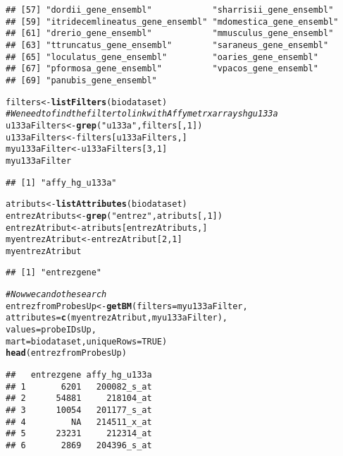 \documentclass{article}\usepackage[]{graphicx}\usepackage[]{color}
\makeatletter
\newcommand{\hlnum}[1]{\textcolor[rgb]{0.686,0.059,0.569}{#1}}%
\newcommand{\hlstr}[1]{\textcolor[rgb]{0.192,0.494,0.8}{#1}}%
\newcommand{\hlcom}[1]{\textcolor[rgb]{0.678,0.584,0.686}{\textit{#1}}}%
\newcommand{\hlstd}[1]{\textcolor[rgb]{0.345,0.345,0.345}{#1}}%
\newcommand{\hlkwb}[1]{\textcolor[rgb]{0.69,0.353,0.396}{#1}}%
\newcommand{\hlkwc}[1]{\textcolor[rgb]{0.333,0.667,0.333}{#1}}%
\newcommand{\hlkwd}[1]{\textcolor[rgb]{0.737,0.353,0.396}{\textbf{#1}}}%
\newenvironment{kframe}{%
 \def\at@end@of@kframe{}%
 \ifinner\ifhmode%
  \def\at@end@of@kframe{\end{minipage}}%
  \begin{minipage}{\columnwidth}%
 \fi\fi%
 \def\FrameCommand##1{\hskip\@totalleftmargin \hskip-\fboxsep
 \colorbox{shadecolor}{##1}\hskip-\fboxsep
     \hskip-\linewidth \hskip-\@totalleftmargin \hskip\columnwidth}%
 \MakeFramed {\advance\hsize-\width
   \@totalleftmargin\z@ \linewidth\hsize
   \@setminipage}}%
 {\par\unskip\endMakeFramed%
 \at@end@of@kframe}
\newenvironment{knitrout}{}{} %
\makeatother
\begin{document}
\begin{knitrout}
\begin{kframe}
\begin{verbatim}
## [57] "dordii_gene_ensembl"            "sharrisii_gene_ensembl"        
## [59] "itridecemlineatus_gene_ensembl" "mdomestica_gene_ensembl"       
## [61] "drerio_gene_ensembl"            "mmusculus_gene_ensembl"        
## [63] "ttruncatus_gene_ensembl"        "saraneus_gene_ensembl"         
## [65] "loculatus_gene_ensembl"         "oaries_gene_ensembl"           
## [67] "pformosa_gene_ensembl"          "vpacos_gene_ensembl"           
## [69] "panubis_gene_ensembl"
\end{verbatim}
\begin{alltt}
\hlstd{filters}\hlkwb{<-}\hlkwd{listFilters}\hlstd{(biodataset)}
\hlcom{# We need to find the filter to link with Affymetrx arrays hgu133a}
\hlstd{u133aFilters}\hlkwb{<-} \hlkwd{grep}\hlstd{(}\hlstr{"u133a"}\hlstd{, filters[,}\hlnum{1}\hlstd{] )}
\hlstd{u133aFilters} \hlkwb{<-} \hlstd{filters[u133aFilters,]}
\hlstd{myu133aFilter} \hlkwb{<-} \hlstd{u133aFilters[}\hlnum{3}\hlstd{,}\hlnum{1}\hlstd{]}
\hlstd{myu133aFilter}
\end{alltt}
\begin{verbatim}
## [1] "affy_hg_u133a"
\end{verbatim}
\begin{alltt}
\hlstd{atributs}\hlkwb{<-} \hlkwd{listAttributes}\hlstd{(biodataset)}
\hlstd{entrezAtributs}\hlkwb{<-} \hlkwd{grep}\hlstd{(}\hlstr{"entrez"}\hlstd{, atributs[,}\hlnum{1}\hlstd{])}
\hlstd{entrezAtribut} \hlkwb{<-} \hlstd{atributs[entrezAtributs,]}
\hlstd{myentrezAtribut} \hlkwb{<-} \hlstd{entrezAtribut[}\hlnum{2}\hlstd{,}\hlnum{1}\hlstd{]}
\hlstd{myentrezAtribut}
\end{alltt}
\begin{verbatim}
## [1] "entrezgene"
\end{verbatim}
\begin{alltt}
\hlcom{# Now we can do the search}
\hlstd{entrezfromProbesUp} \hlkwb{<-} \hlkwd{getBM}\hlstd{(}\hlkwc{filters}\hlstd{= myu133aFilter,}
                          \hlkwc{attributes}\hlstd{=} \hlkwd{c}\hlstd{(myentrezAtribut, myu133aFilter),}
                          \hlkwc{values}\hlstd{= probeIDsUp,}
                          \hlkwc{mart}\hlstd{= biodataset,}\hlkwc{uniqueRows}\hlstd{=}\hlnum{TRUE}\hlstd{)}
\hlkwd{head}\hlstd{(entrezfromProbesUp)}
\end{alltt}
\begin{verbatim}
##   entrezgene affy_hg_u133a
## 1       6201   200082_s_at
## 2      54881     218104_at
## 3      10054   201177_s_at
## 4         NA   214511_x_at
## 5      23231     212314_at
## 6       2869   204396_s_at
\end{verbatim}
\end{kframe}
\end{knitrout}
\end{document}
